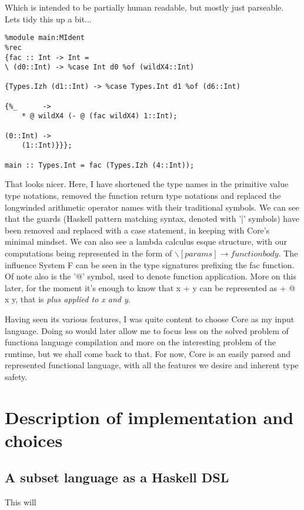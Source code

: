 \documentclass[11pt]{article}
\begin{document}
\noindent Which is intended to be partially human readable, but mostly
just parseable. Lets tidy this up a bit...

\begin{verbatim}
%module main:MIdent
%rec
{fac :: Int -> Int =
\ (d0::Int) -> %case Int d0 %of (wildX4::Int)

{Types.Izh (d1::Int) -> %case Types.Int d1 %of (d6::Int)

{%_      ->
    * @ wildX4 (- @ (fac wildX4) 1::Int);

(0::Int) ->
    (1::Int)}}};

main :: Types.Int = fac (Types.Izh (4::Int));
\end{verbatim}

\noindent That looks nicer. Here, I have shortened the type names in the
primitive value type notations, removed the function return type notations
and replaced the longwinded arithmetic operator names with their traditional
symbols. We can see that the guards (Haskell pattern matching syntax, denoted
with '|' symbols) have been removed and replaced with a case statement, in
keeping with Core's minimal mindset. We can also see a lambda calculus esque
structure, with our computations being represented in the form of \( \backslash
 [params] \rightarrow function body\). The influence System F can be seen in
 the type signatures prefixing the fac function. Of note also is the '@' symbol, used
 to denote function application. More on this later, for the moment it's enough
 to know that x + y can be represented as + @ x y, that is \emph{plus applied to
 x and y}.
 
Having seen its various features, I was quite content to choose Core as my
input language. Doing so would later allow me to focus less on the solved
problem of functiona language compilation and more on the interesting problem of
the runtime, but we shall come back to that. For now, Core is an easily parsed
and represented functional language, with all the features we desire and inherent
type safety. 

\section{Description of implementation and choices}

\subsection{A subset language as a Haskell DSL}
This will 
\end{document}
